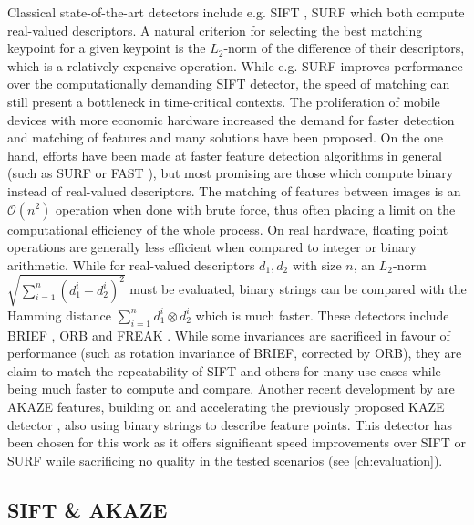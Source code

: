 Classical state-of-the-art detectors include e.g. SIFT \citep{lowe1999}, SURF
\citep{bay2006} which both compute real-valued descriptors. A natural criterion
for selecting the best matching keypoint for a given keypoint is the $L_2$-norm
of the difference of their descriptors, which is a relatively expensive
operation. While e.g. SURF improves performance over the computationally
demanding SIFT detector, the speed of matching can still present a bottleneck in
time-critical contexts. The proliferation of mobile devices with more economic
hardware increased the demand for faster detection and matching of features and
many solutions have been proposed. On the one hand, efforts have been made at
faster feature detection algorithms in general (such as SURF or FAST
\citep{rosten2005}), but most promising are those which compute binary instead
of real-valued descriptors. The matching of features between images is an
$\mathcal{O}(n^2)$ operation when done with brute force, thus often placing a
limit on the computational efficiency of the whole process. On real hardware,
floating point operations are generally less efficient when compared to integer
or binary arithmetic. While for real-valued descriptors $d_1,d_2$ with size $n$,
an $L_2$-norm $\sqrt{\sum_{i=1}^n (d_1^i - d_2^i)^2}$ must be evaluated,
binary strings can be compared with the Hamming distance $\sum_{i=1}^n d_1^i
\otimes d_2^i$ which is much faster. These detectors include BRIEF
\citep[Binary Robust Independent Elementary Features]{calonder2010}, ORB
\citep[Oriented BRIEF]{rublee2011} and FREAK \citep[Fast Retina
Keypoint]{ortiz2012}. While some invariances are sacrificed in favour of
performance (such as rotation invariance of BRIEF, corrected by ORB), they are
claim to match the repeatability of SIFT and others for many use cases while
being much faster to compute and compare. Another recent development by
\citet{alcantarilla2013} are AKAZE features, building on and accelerating the
previously proposed KAZE detector \citep{alcantarilla2012}, also using binary
strings to describe feature points. This detector has been chosen for this work
as it offers significant speed improvements over SIFT or SURF while sacrificing
no quality in the tested scenarios (see \autoref{ch:evaluation}).

\subsection{SIFT \& AKAZE}


